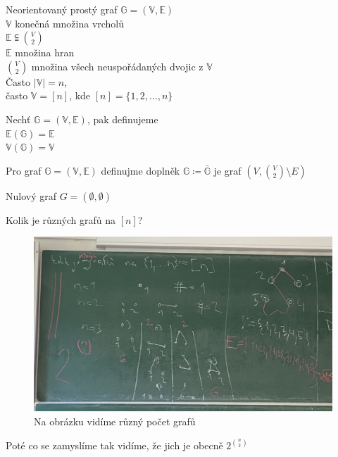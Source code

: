 \documentclass[../main.tex]{subfiles}
\begin{document}
\begin{definition}


    Neorientovaný prostý graf $\mathbb{G} = (\mathbb{V}, \mathbb{E})$ \\
    $\mathbb{V}$ konečná množina vrcholů \\
    $\mathbb{E} \subseteqq \binom{V}{2}$ \\
    $\mathbb{E} $ množina hran\\
    $\binom{V}{2}$  množina všech neuspořádaných dvojic z $\mathbb{V}$ \\


    Často $|\mathbb{V}|=n$,\\
    často $\mathbb{V} = [n]$, kde $[n] = \{1,2,...,n\}$ 
\end{definition}


\begin{definition}
    Nechť $\mathbb{G} = (\mathbb{V}, \mathbb{E})$, pak definujeme \\
    $\mathbb{E}(\mathbb{G}) = \mathbb{E}$\\
    $\mathbb{V}(\mathbb{G}) = \mathbb{V}$
\end{definition}

\begin{definition}
    Pro graf $\mathbb{G} = (\mathbb{V}, \mathbb{E})$ definujme  doplněk $\mathbb{G} \coloneq \bar{\mathbb{G}}$ je graf $(V, \binom{V}{2}\setminus E )$
\end{definition}

\begin{definition}
    Nulový graf $G = (\emptyset, \emptyset)$ 
\end{definition}

\begin{example}
    Kolik je různých grafů na $[n]$?

    \begin{figure}[h]
        \centering
        \includegraphics[width=\textwidth/2]{images/27-9-pocetgrafu.png}
        \caption*{Na obrázku vidíme různý počet grafů}
    \end{figure} 

    Poté co se zamyslíme tak vidíme, že jich je obecně $2^{\binom{n}{2}}$
\end{example}
\end{document}
